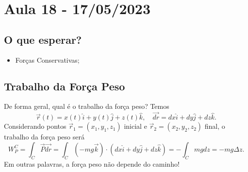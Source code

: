 \documentclass[PhysicsI/physics_notes.tex]{subfiles}
\begin{document}
\section{Aula 18 - 17/05/2023}
\subsection{O que esperar?}
\begin{itemize}
	\item Forças Conservativas;
\end{itemize}
\subsection{Trabalho da Força Peso}
De forma geral, qual é o trabalho da força peso? Temos
\[
	\vec{r}(t) = x(t)\hat{i} + y(t)\hat{j} + z(t)\hat{k},\quad \vec{dr} = dx \hat{i} + dy \hat{j} + dz \hat{k}.
\]
Considerando pontos \(\vec{r}_{1} = (x_{1}, y_{1}, z_{1})\) inicial e \(\vec{r}_{2} = (x_{2}, y_{2}, z_{2})\) final, o trabalho da força peso será
\[
	W_{P}^{C} = \int_{C}^{} \vec{P} \vec{dr} = \int_{C}^{}(-mg \vec{k})\cdot (dx \hat{i} + dy \hat{j} + dz \hat{k}) = - \int_{C}^{}mgdz = -mg\Delta z.
\]
Em outras palavras, a força peso não depende do caminho!
\end{document}
